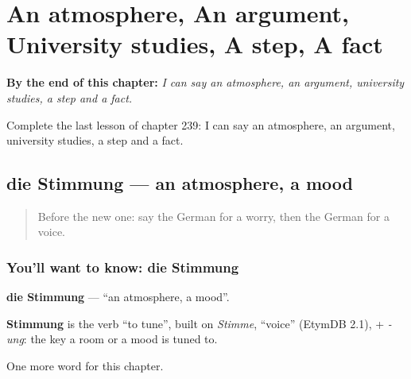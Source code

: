 
\chapter{An atmosphere, An argument, University studies, A step, A fact}
\label{ch:ge-an-atmosphere-an-argument-university-studies-a-step-a-fact}

\begin{chapteropening}
\textbf{By the end of this chapter:} \emph{I can say an atmosphere, an argument, university studies, a step and a fact.}

Complete the last lesson of chapter 239: I can say an atmosphere, an argument, university studies, a step and a fact.
\end{chapteropening}

\section[die Stimmung]{die Stimmung — an atmosphere, a mood}

\label{lesson:GE-C239-stimmung}



\begin{quote}
Before the new one: say the German for a worry, then the German for a voice.
\end{quote}

\subsection*{You'll want to know: die Stimmung}
\textbf{die Stimmung} — \textquotedblleft{}an atmosphere, a mood\textquotedblright{}.

\begin{cousinweb}
\textbf{Stimmung} is the verb \textquotedblleft{}to tune\textquotedblright{}, built on \emph{Stimme}, \textquotedblleft{}voice\textquotedblright{} (EtymDB 2.1), + \emph{-ung}: the key a room or a mood is tuned to.
\end{cousinweb}

\begin{grammarlens}[title={What you've built}]
One more word for this chapter.
\end{grammarlens}


